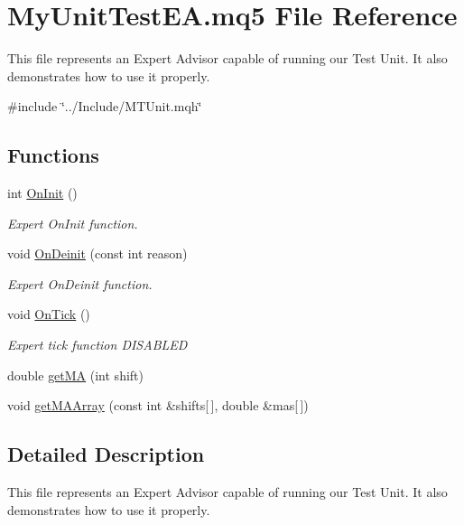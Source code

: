\hypertarget{_my_unit_test_e_a_8mq5}{}\section{My\+Unit\+Test\+E\+A.\+mq5 File Reference}
\label{_my_unit_test_e_a_8mq5}


This file represents an Expert Advisor capable of running our Test Unit. It also demonstrates how to use it properly.  


{\ttfamily \#include \char`\"{}../\+Include/\+M\+T\+Unit.\+mqh\char`\"{}}\newline
\subsection*{Functions}
\begin{DoxyCompactItemize}
\item 
int \mbox{\hyperlink{_my_unit_test_e_a_8mq5_a53dc1cd6aabfadddd579c1b1010e7d52}{On\+Init}} ()
\begin{DoxyCompactList}\small\item\em Expert On\+Init function. \end{DoxyCompactList}\item 
void \mbox{\hyperlink{_my_unit_test_e_a_8mq5_a3f95d0fb3935a6dd3f45618a48fea55b}{On\+Deinit}} (const int reason)
\begin{DoxyCompactList}\small\item\em Expert On\+Deinit function. \end{DoxyCompactList}\item 
void \mbox{\hyperlink{_my_unit_test_e_a_8mq5_a94383cb2b73d2bc8d5536e293232374f}{On\+Tick}} ()
\begin{DoxyCompactList}\small\item\em Expert tick function {\itshape D\+I\+S\+A\+B\+L\+ED} \end{DoxyCompactList}\item 
double \mbox{\hyperlink{_my_unit_test_e_a_8mq5_a7b3651ef0dea162e4f2217474bf878aa}{get\+MA}} (int shift)
\item 
void \mbox{\hyperlink{_my_unit_test_e_a_8mq5_a2522426d9de7bcd6c5348e9e2835b36d}{get\+M\+A\+Array}} (const int \&shifts\mbox{[}$\,$\mbox{]}, double \&mas\mbox{[}$\,$\mbox{]})
\end{DoxyCompactItemize}


\subsection{Detailed Description}
This file represents an Expert Advisor capable of running our Test Unit. It also demonstrates how to use it properly. 

